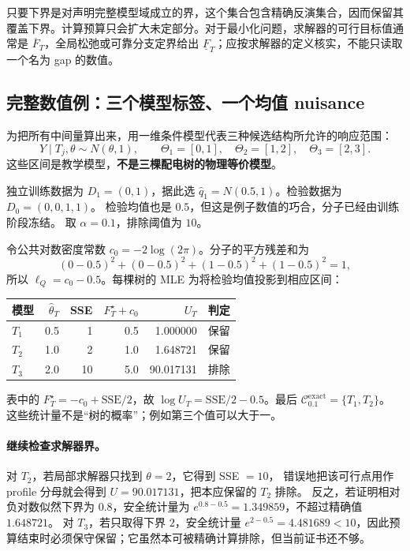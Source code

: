 \documentclass[UTF8,11pt,fontset=fandol,openany,oneside]{ctexbook}
\theoremstyle{definition}
\theoremstyle{remark}
\numberwithin{equation}{chapter}
\begin{document}
只要下界是对声明完整模型域成立的界，这个集合包含精确反演集合，因而保留其覆盖下界。计算预算只会扩大未定部分。对于最小化问题，求解器的可行目标值通常是 $\overline F_T$，全局松弛或可靠分支定界给出 $\underline F_T$；应按求解器的定义核实，不能只读取一个名为 gap 的数值。

\subsection{完整数值例：三个模型标签、一个均值 nuisance}

为把所有中间量算出来，用一维条件模型代表三种候选结构所允许的响应范围：
\[
 Y\mid T_j,\theta\sim N(\theta,1),\qquad
 \Theta_1=[0,1],\quad\Theta_2=[1,2],\quad\Theta_3=[2,3].
\]
这些区间是教学模型，\textbf{不是三棵配电树的物理等价模型}。

独立训练数据为 $D_1=(0,1)$，据此选
$\widehat q_1=N(0.5,1)$。检验数据为 $D_0=(0,0,1,1)$。
检验均值也是 $0.5$，但这是例子数值的巧合，分子已经由训练阶段冻结。
取 $\alpha=0.1$，排除阈值为 $10$。

令公共对数密度常数 $c_0=-2\log(2\pi)$。分子的平方残差和为
\[
 (0-0.5)^2+(0-0.5)^2+(1-0.5)^2+(1-0.5)^2=1,
\]
所以 $\ell_Q=c_0-0.5$。每棵树的 MLE 为将检验均值投影到相应区间：
\begin{center}
\begin{tabular}{lrrrrl}
\toprule
模型 & $\widehat\theta_T$ & SSE & $F_T^\star+c_0$ & $U_T$ & 判定\\
\midrule
$T_1$ & 0.5 & 1 & 0.5 & 1.000000 & 保留\\
$T_2$ & 1.0 & 2 & 1.0 & 1.648721 & 保留\\
$T_3$ & 2.0 & 10 & 5.0 & 90.017131 & 排除\\
\bottomrule
\end{tabular}
\end{center}
表中的 $F_T^\star=-c_0+\mathrm{SSE}/2$，故
$\log U_T=\mathrm{SSE}/2-0.5$。最后
$\mathcal C_{0.1}^{\mathrm{exact}}=\{T_1,T_2\}$。
这些统计量不是“树的概率”；例如第三个值可以大于一。

\paragraph{继续检查求解器界。}
对 $T_2$，若局部求解器只找到 $\theta=2$，它得到 SSE $=10$，
错误地把该可行点用作 profile 分母就会得到 $U=90.017131$，把本应保留的 $T_2$ 排除。
反之，若证明相对负对数似然下界为 $0.8$，安全统计量为
$e^{0.8-0.5}=1.349859$，不超过精确值 $1.648721$。
对 $T_3$，若只取得下界 $2$，安全统计量
$e^{2-0.5}=4.481689<10$，因此预算结束时必须保守保留；它虽然本可被精确计算排除，但当前证书还不够。
\end{document}
